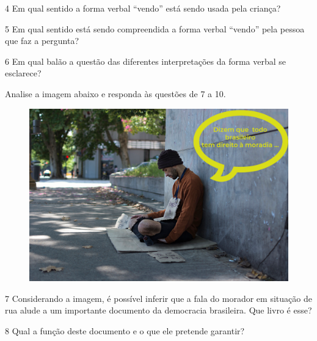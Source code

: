 \num{4} Em qual sentido a forma verbal ``vendo'' está sendo usada pela
criança?


\num{5} Em qual sentido está sendo compreendida a forma verbal ``vendo''
pela pessoa que faz a pergunta?


\num{6} Em qual balão a questão das diferentes interpretações da 
forma verbal se esclarece?


Analise a imagem abaixo e responda às questões de 7 a 10. 

\begin{figure}[h!]
\centering\includegraphics[width=5in]{./imgSAEB_7_POR/media/image5.png}
\end{figure}

\num{7} Considerando a imagem, é possível
inferir que a fala do morador em situação de rua alude a um importante
documento da democracia brasileira. Que livro é
esse?


\num{8} Qual a função deste documento e o que ele pretende garantir?

